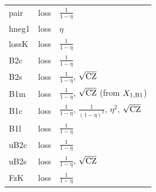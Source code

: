 \begin{table}
\begin{ruledtabular}
\begin{tabular}{lll}
pair & loss & $\frac1{1-\eta}$\\
hneg1 & loss & $\eta$\\
lossK & loss & $\frac1{1-\eta}$\\
B2c & loss & $\frac1{1-\eta}$\\
B2s & loss & $\frac1{1-\eta}$, $\sqrt{\rm CZ}$\\
B1m & loss & $\frac1{1-\eta}$, $\sqrt{\rm CZ}$ (from $X_{1,\rm B1}$)\\
B1c & loss & $\frac1{1-\eta}$, $\frac1{(1-\eta)^2}$, $\eta^2$, $\sqrt{\rm CZ}$\\
B1l & loss & $\frac1{1-\eta}$\\
uB2c & loss & $\frac1{1-\eta}$\\
uB2s & loss & $\frac1{1-\eta}$, $\sqrt{\rm CZ}$\\
FzK & loss & $\frac1{1-\eta}$\\
\end{tabular}
\end{ruledtabular}
\end{table}
